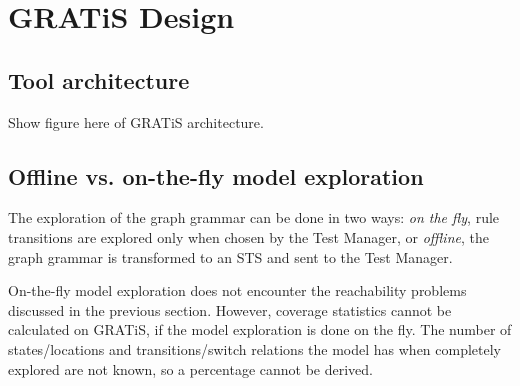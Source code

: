 \section{GRATiS Design}\label{sec:gratis-design}

\subsection{Tool architecture}
Show figure here of GRATiS architecture.

\subsection{Offline vs. on-the-fly model exploration}
The exploration of the graph grammar can be done in two ways: \textit{on the fly}, rule transitions are explored only when chosen by the Test Manager, or \textit{offline}, the graph grammar is transformed to an STS and sent to the Test Manager.

On-the-fly model exploration does not encounter the reachability problems discussed in the previous section. However, coverage statistics cannot be calculated on GRATiS, if the model exploration is done on the fly. The number of states/locations and transitions/switch relations the model has when completely explored are not known, so a percentage cannot be derived.
